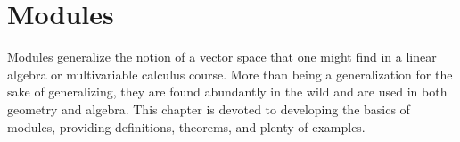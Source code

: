 \begingroup
    \ifcsname\PATH\endcsname
        \newcommand{\PATH}{books/Algebra/Modules}
        \newcommand{\OLDPATH}{\PATH}
    \else
        \newcommand{\OLDPATH}{\PATH}
        \renewcommand{\PATH}{books/Algebra/Modules}
    \fi
    \chapter{Modules}
        Modules generalize the notion of a vector space that one might find in a
        linear algebra or multivariable calculus course. More than being
        a generalization for the sake of generalizing, they are found
        abundantly in the wild and are used in both geometry and algebra. This
        chapter is devoted to developing the basics of modules, providing
        definitions, theorems, and plenty of examples.
        

    \renewcommand{\PATH}{\OLDPATH}
\endgroup